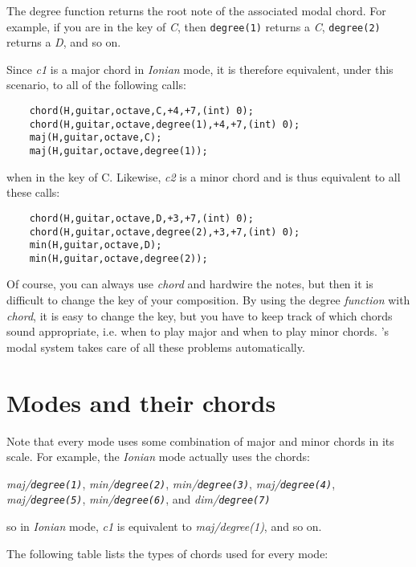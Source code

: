 \documentclass{article}
\begin{document}
The degree function returns the root note of the associated modal
chord. For example,
if you are in the key of {\it C}, then
{\tt degree(1)} returns a {\it C},
{\tt degree(2)} returns a {\it D},
and so on.

Since {\it c1} is a major chord in {\it Ionian} mode, it is therefore 
equivalent, under this scenario, to all of the following calls:

\begin{verbatim}
    chord(H,guitar,octave,C,+4,+7,(int) 0);
    chord(H,guitar,octave,degree(1),+4,+7,(int) 0);
    maj(H,guitar,octave,C);
    maj(H,guitar,octave,degree(1));
\end{verbatim}

when in the key of C.
Likewise, {\it c2} is a minor chord and
is thus equivalent to all these calls:

\begin{verbatim}
    chord(H,guitar,octave,D,+3,+7,(int) 0);
    chord(H,guitar,octave,degree(2),+3,+7,(int) 0);
    min(H,guitar,octave,D);
    min(H,guitar,octave,degree(2));
\end{verbatim}

Of course, you can always use {\it chord} and hardwire the notes,
but then it is difficult to change the key of your composition.
By using the degree {\it function} with {\it chord}, it is easy to change the
key,
but you have to keep track of which
chords sound appropriate, i.e. when to play major and
when to play minor chords. \Songlib's modal system
takes care of all these problems automatically.
    
\section*{Modes and their chords}

Note that
every mode uses some combination of major and
minor chords in its scale. For example, 
the {\it Ionian} mode actually uses the chords:

\begin{center}
{\it maj/{\tt degree(1)}},
{\it min/{\tt degree(2)}},
{\it min/{\tt degree(3)}},
{\it maj/{\tt degree(4)}},
{\it maj/{\tt degree(5)}},
{\it min/{\tt degree(6)}}, and
{\it dim/{\tt degree(7)}}
\end{center}

so in {\it Ionian} mode, {\it c1} is equivalent to {\it maj/degree(1)},
and so on.

The following table lists the types of chords used for
every mode:
\end{document}
